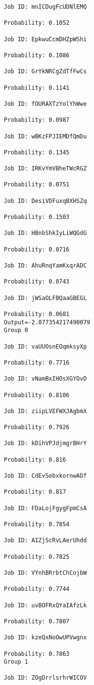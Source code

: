 \documentclass[11pt]{article}
\begin{document}
\begin{Verbatim}[commandchars=\\\{\}]
Job ID: mnICDugFcUDNlEMQ

Probability: 0.1052

Job ID: EpkwuCcmDHZpWShi

Probability: 0.1086

Job ID: GrYkNRCgZdTfFwCs

Probability: 0.1141

Job ID: fOURAXTzYolYhWwe

Probability: 0.0987

Job ID: wBKzFPJIEMDfQmDu

Probability: 0.1345

Job ID: IRKvYmVBheTWcRGZ

Probability: 0.0751

Job ID: DesiVDFuxqBXHSZq

Probability: 0.1503

Job ID: HBnbShkIyLiWQGdG

Probability: 0.0716

Job ID: AhuRnqYamKxqrADC

Probability: 0.0743

Job ID: jWSaOLFBQaaGBEGL

Probability: 0.0681
Output=-2.077354217490079
Group 0

Job ID: vaUUOsnEOqmksyXp

Probability: 0.7716

Job ID: vNamBxIHOsXGYOvD

Probability: 0.8106

Job ID: ziipLVEFWXJAgbmX

Probability: 0.7926

Job ID: kDihVPJdjmgrBHrY

Probability: 0.816

Job ID: CdEvSebxkornwADf

Probability: 0.817

Job ID: FDaLojFgygFpmCsA

Probability: 0.7854

Job ID: AIZjScRvLAerUhdd

Probability: 0.7825

Job ID: VYnhBRrbtChCojbW

Probability: 0.7744

Job ID: uvBOFRxQYaIAfzLk

Probability: 0.7807

Job ID: kzeQxNoOwUPVwgnx

Probability: 0.7863
Group 1

Job ID: ZOgDrrlsrhrWICOV


\end{Verbatim}
\end{document}
